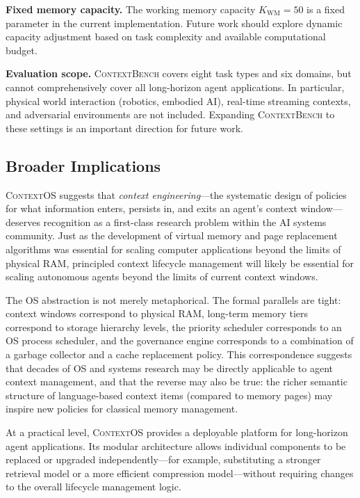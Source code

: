 \documentclass[review,12pt]{elsarticle}
\newcommand{\contextos}{\textsc{ContextOS}}
\newcommand{\contextbench}{\textsc{ContextBench}}
\begin{document}
\textbf{Fixed memory capacity.}  The working memory capacity
$K_{\text{WM}} = 50$ is a fixed parameter in the current implementation.
Future work should explore dynamic capacity adjustment based on task complexity
and available computational budget.

\textbf{Evaluation scope.}  \contextbench{} covers eight task types and six
domains, but cannot comprehensively cover all long-horizon agent applications.
In particular, physical world interaction (robotics, embodied AI), real-time
streaming contexts, and adversarial environments are not included.  Expanding
\contextbench{} to these settings is an important direction for future work.

\subsection{Broader Implications}
\label{subsec:implications}

\contextos{} suggests that \emph{context engineering}—the systematic design
of policies for what information enters, persists in, and exits an agent's
context window—deserves recognition as a first-class research problem
within the AI systems community.  Just as the development of virtual memory
and page replacement algorithms was essential for scaling computer applications
beyond the limits of physical RAM, principled context lifecycle management
will likely be essential for scaling autonomous agents beyond the limits of
current context windows.

The OS abstraction is not merely metaphorical.  The formal parallels are
tight: context windows correspond to physical RAM, long-term memory tiers
correspond to storage hierarchy levels, the priority scheduler corresponds
to an OS process scheduler, and the governance engine corresponds to a
combination of a garbage collector and a cache replacement policy.  This
correspondence suggests that decades of OS and systems research may be directly
applicable to agent context management, and that the reverse may also be true:
the richer semantic structure of language-based context items (compared to
memory pages) may inspire new policies for classical memory management.

At a practical level, \contextos{} provides a deployable platform for
long-horizon agent applications.  Its modular architecture allows individual
components to be replaced or upgraded independently—for example, substituting
a stronger retrieval model or a more efficient compression model—without
requiring changes to the overall lifecycle management logic.
\end{document}
